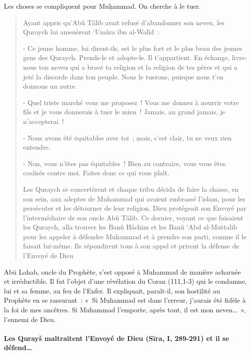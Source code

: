 Les choses se compliquent pour Muḥammad. On cherche à le tuer.
\begin{quote}
    

{Ayant appris qu'Abû Tâlib avait refusé d'abandonner son neveu, les
Quraych lui amenèrent `Umâra ibn al-Walîd~:}

{- Ce jeune homme, lui dirent-ils, est le plus fort et le plus beau
des jeunes gens des Quraych. Prends-le et adopte-le. Il t'appartient. En
échange, livre-nous ton neveu qui a bravé ta religion et la religion de
tes pères et qui a jeté la discorde dans ton peuple. Nous le tuerons,
puisque nous t'en donnons un autre.}

{- Quel triste marché vous me proposez~! Vous me donnez à nourrir
votre fils et je vous donnerais à tuer le mien~! Jamais, au grand
jamais, je n'accepterai~!}

{- Nous avons été équitables avec toi~; mais, c'est clair, tu ne
veux rien entendre.}

{- Non, vous n'êtes pas équitables~! Bien au contraire, vous vous
êtes coalisés contre moi. Faites donc ce qui vous plaît.}

{Les Quraych se concertèrent et chaque tribu décida de faire la
chasse, en son sein, aux adeptes de Muhammad qui avaient embrassé
l'islam, pour les persécuter et les détourner de leur religion. Dieu
protégeait son Envoyé par l'intermédiaire de son oncle Abû Tâlib. Ce
dernier, voyant ce que faisaient les Quraych, alla trouver les Banû
Hâchim et les Banû `Abd al-Muttalib pour les appeler à défendre Muhammad
et à prendre son parti, comme il le faisait lui-même. Ils répondirent
tous à son appel et prirent la défense de l'Envoyé de
Dieu}
\end{quote}
{Abū Lahab, oncle du Prophète, s'est opposé à Muhammad de
  manière acharnée et irréductible. Il fut l'objet d'une révélation du
  Coran (111,1-3) qui le condamne, lui et sa femme, au feu de l'Enfer.
  Il expliquait, paraît-il, son hostilité au Prophète en se rassurant~:
  «~Si Muhammad est dans l'erreur, j'aurais été fidèle à la foi de mes
  ancêtres. Si Muhammad l'emporte, après tout, il est mon neveu\ldots~»}{,
l'ennemi de Dieu.}


\paragraph{Les Qurayš maltraitent l'Envoyé de Dieu
(Sīra, I, 289-291) et il se défend\ldots{}
}

